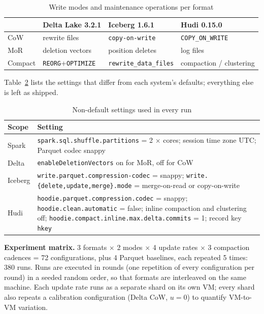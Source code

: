 \documentclass[conference]{IEEEtran}
\begin{document}
\begin{table}[t]
\centering\caption{Write modes and maintenance operations per format}\label{tab:config}
\scriptsize\setlength{\tabcolsep}{3pt}
\begin{tabular}{@{}llll@{}}
\toprule
 & Delta Lake 3.2.1 & Iceberg 1.6.1 & Hudi 0.15.0\\ \midrule
CoW & rewrite files & \texttt{copy-on-write} & \texttt{COPY\_ON\_WRITE}\\
MoR & deletion vectors & position deletes & log files\\
Compact & \texttt{REORG}+\texttt{OPTIMIZE} & \texttt{rewrite\_data\_files} & compaction / clustering\\
\bottomrule
\end{tabular}
\end{table}

Table~\ref{tab:settings} lists the settings that differ from each system's defaults; everything else is left as shipped.

\begin{table}[!t]\centering
\caption{Non-default settings used in every run}\label{tab:settings}
\scriptsize\setlength{\tabcolsep}{3pt}
\begin{tabular}{@{}lp{6.5cm}@{}}\toprule
Scope & Setting\\\midrule
Spark & \texttt{spark.sql.shuffle.partitions} = 2 $\times$ cores; session time zone UTC; Parquet codec snappy\\
Delta & \texttt{enableDeletionVectors} on for MoR, off for CoW\\
Iceberg & \texttt{write.parquet.compression-codec} = snappy; \texttt{write.\{delete,update,merge\}.mode} = merge-on-read or copy-on-write\\
Hudi & \texttt{hoodie.parquet.compression.codec} = snappy; \texttt{hoodie.clean.automatic} = false; inline compaction and clustering off; \texttt{hoodie.compact.inline.max.delta.commits} = 1; record key \texttt{hkey}\\\bottomrule
\end{tabular}
\end{table}

\textbf{Experiment matrix.} 3 formats $\times$ 2 modes $\times$ 4 update rates $\times$ 3 compaction cadences = 72
configurations, plus 4 Parquet baselines, each repeated 5 times: 380 runs. Runs are executed in rounds (one
repetition of every configuration per round) in a seeded random order, so that formats are interleaved on the same
machine. Each update rate runs as a separate shard on its own VM; every shard also repeats a calibration
configuration (Delta CoW, $u=0$) to quantify VM-to-VM variation.
\end{document}
